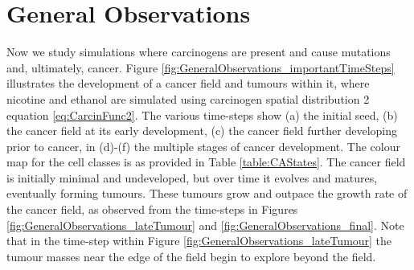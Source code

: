 \documentclass[\main/thesis.tex]{subfiles}
\begin{document}
\section{General Observations}
Now we study simulations where carcinogens are present and cause mutations and, ultimately, cancer. Figure \ref{fig:GeneralObservations_importantTimeSteps} illustrates the development of a cancer field and tumours within it, where nicotine and ethanol are simulated using carcinogen spatial distribution 2 equation \eqref{eq:CarcinFunc2}. The various time-steps show (a) the initial seed, (b) the cancer field at its early development, (c) the cancer field further developing prior to cancer, in (d)-(f) the multiple stages of cancer development.  The colour map for the cell classes is as provided in Table \ref{table:CAStates}. The cancer field is initially minimal and undeveloped, but over time it evolves and matures, eventually forming tumours. These tumours grow and outpace the growth rate of the cancer field, as observed from the time-steps in Figures \ref{fig:GeneralObservations_lateTumour} and \ref{fig:GeneralObservations_final}. Note that in the time-step within Figure \ref{fig:GeneralObservations_lateTumour} the tumour masses near the edge of the field begin to explore beyond the field.
\end{document}
